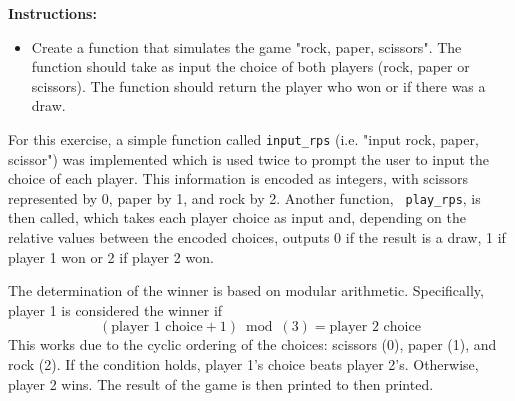 \documentclass{article}
\newcounter{exercise}
\newenvironment{exr}[1]{%
    \refstepcounter{exercise}
    \begin{tcolorbox}[colback=blue!5!white, colframe=blue!75!black, title=Exercise \theexercise]
    \textbf{Instructions:} #1
    \end{tcolorbox}
    \vspace{1em}
}{}
\begin{document}


\begin{exr}{
    \begin{itemize}
        \item Create a function that simulates the game "rock, paper, scissors". The function should take as input the choice of both players (rock, paper or scissors). The function should return the player who won or if there was a draw.
    \end{itemize}
    }
\end{exr}

For this exercise, a simple function called \texttt{input\_rps} (i.e. "input rock, paper, scissor") was implemented which is used twice to prompt the user to input the choice of each player. This information is encoded as integers, with scissors represented by 0, paper by 1, and rock by 2. Another function, \texttt{ play\_rps}, is then called, which takes each player choice as input and, depending on the relative values between the encoded choices, outputs 0 if the result is a draw, 1 if player 1 won or 2 if player 2 won. 

The determination of the winner is based on modular arithmetic. Specifically, player 1 is considered the winner if 
\begin{equation*}
    (\text{player 1 choice} + 1) \bmod(3) = \text{player 2 choice} 
\end{equation*}
This works due to the cyclic ordering of the choices: scissors (0), paper (1), and rock (2). If the condition holds, player 1's choice beats player 2's. Otherwise, player 2 wins. The result of the game is then printed to then printed.


\end{document}
